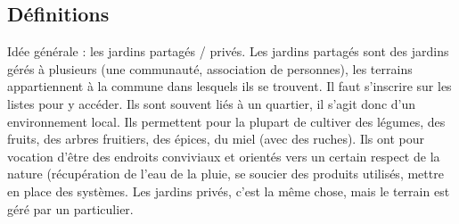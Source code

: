 \documentclass[french,a4paper]{article}
\begin{document}
\subsection{Définitions}
Idée générale : les jardins partagés / privés. Les jardins partagés sont des jardins gérés à plusieurs (une communauté, association de personnes), les terrains appartiennent à la commune dans lesquels ils se trouvent. Il faut s’inscrire sur les listes pour y accéder. Ils sont souvent liés à un quartier, il s’agit donc d’un environnement local. Ils permettent pour la plupart de cultiver des légumes, des fruits, des arbres fruitiers, des épices, du miel (avec des ruches). Ils ont pour vocation d’être des endroits conviviaux et orientés vers un certain respect de la nature (récupération de l’eau de la pluie, se soucier des produits utilisés, mettre en place des systèmes.
Les jardins privés, c’est la même chose, mais le terrain est géré par un particulier.
\end{document}
